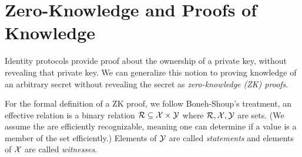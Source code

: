 \section{Zero-Knowledge and Proofs of Knowledge}
\label{sec:zknowledge}
Identity protocols provide proof about the ownership of a private key, without revealing that private key.
We can generalize this notion to proving knowledge of an arbitrary secret without revealing the secret as \emph{zero-knowledge (ZK) proofs}.

For the formal definition of a ZK proof, we follow Boneh-Shoup's treatment, an effective relation is a binary relation ${\cal R} \subseteq {\cal X} \times {\cal Y}$  where ${\cal R}, {\cal X},{\cal Y}$ are sets.
(We assume the are efficiently recognizable, meaning one can determine if a value is a member of the set efficiently.)
Elements of ${\cal Y}$ are called \emph{statements} and elements of ${\cal X}$ are called \emph{witnesses}.




